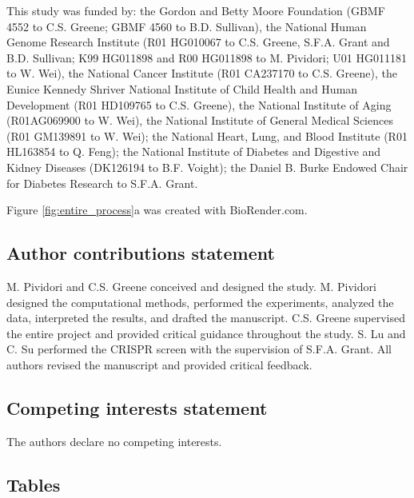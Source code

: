 \documentclass[
  a4paper,
]{article}
\begin{document}
This study was funded by:
the Gordon and Betty Moore Foundation (GBMF 4552 to C.S. Greene; GBMF 4560 to B.D. Sullivan),
the National Human Genome Research Institute (R01 HG010067 to C.S. Greene, S.F.A. Grant and B.D. Sullivan; K99 HG011898 and R00 HG011898 to M. Pividori; U01 HG011181 to W. Wei),
the National Cancer Institute (R01 CA237170 to C.S. Greene),
the Eunice Kennedy Shriver National Institute of Child Health and Human Development (R01 HD109765 to C.S. Greene),
the National Institute of Aging (R01AG069900 to W. Wei),
the National Institute of General Medical Sciences (R01 GM139891 to W. Wei);
the National Heart, Lung, and Blood Institute (R01 HL163854 to Q. Feng);
the National Institute of Diabetes and Digestive and Kidney Diseases (DK126194 to B.F. Voight);
the Daniel B. Burke Endowed Chair for Diabetes Research to S.F.A. Grant.

Figure \ref{fig:entire_process}a was created with BioRender.com.

\hypertarget{author-contributions-statement}{%
\subsection{Author contributions statement}\label{author-contributions-statement}}

M. Pividori and C.S. Greene conceived and designed the study.
M. Pividori designed the computational methods, performed the experiments, analyzed the data, interpreted the results, and drafted the manuscript.
C.S. Greene supervised the entire project and provided critical guidance throughout the study.
S. Lu and C. Su performed the CRISPR screen with the supervision of S.F.A. Grant.
All authors revised the manuscript and provided critical feedback.

\hypertarget{competing-interests-statement}{%
\subsection{Competing interests statement}\label{competing-interests-statement}}

The authors declare no competing interests.

\clearpage

\hypertarget{tables}{%
\subsection{Tables}\label{tables}}
\end{document}
